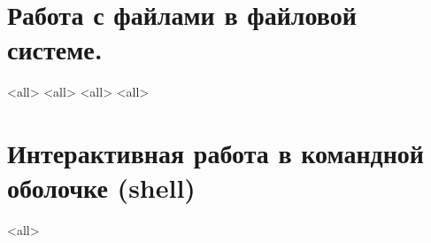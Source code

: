\section{Работа с файлами в файловой системе.}
\mode<all>{}
\mode<all>{}
\mode<all>{}
\mode<all>{}
\section{Интерактивная работа в командной оболочке (shell)}
\mode<all>{}

\bye
